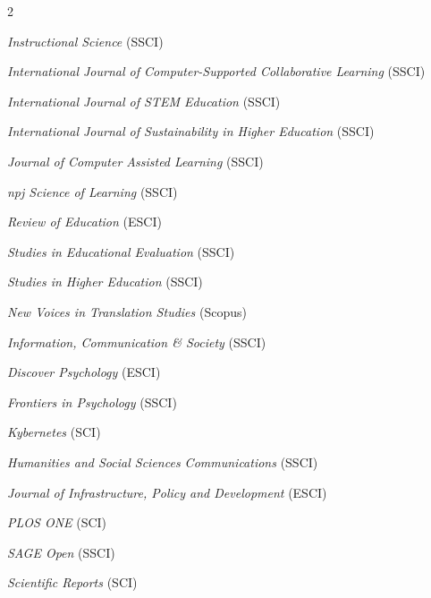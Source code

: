 \documentclass[11pt,a4paper]{article}
\begin{document}
\begin{multicols}{2}
\begin{list}{}{\setlength{\leftmargin}{0em}\setlength{\topsep}{0pt}\setlength{\partopsep}{0pt}\setlength{\parskip}{0em}\setlength{\itemsep}{0.03em}\setlength{\parsep}{0em}}
  \item \textit{Instructional Science} {\footnotesize\color{black!65}(SSCI)}
  \item \textit{International Journal of Computer-Supported Collaborative Learning} {\footnotesize\color{black!65}(SSCI)}
  \item \textit{International Journal of STEM Education} {\footnotesize\color{black!65}(SSCI)}
  \item \textit{International Journal of Sustainability in Higher Education} {\footnotesize\color{black!65}(SSCI)}
  \item \textit{Journal of Computer Assisted Learning} {\footnotesize\color{black!65}(SSCI)}
  \item \textit{npj Science of Learning} {\footnotesize\color{black!65}(SSCI)}
  \item \textit{Review of Education} {\footnotesize\color{black!65}(ESCI)}
  \item \textit{Studies in Educational Evaluation} {\footnotesize\color{black!65}(SSCI)}
  \item \textit{Studies in Higher Education} {\footnotesize\color{black!65}(SSCI)}
  \item \textit{New Voices in Translation Studies} {\footnotesize\color{black!65}(Scopus)}
  \item \textit{Information, Communication \& Society} {\footnotesize\color{black!65}(SSCI)}
  \item \textit{Discover Psychology} {\footnotesize\color{black!65}(ESCI)}
  \item \textit{Frontiers in Psychology} {\footnotesize\color{black!65}(SSCI)}
  \item \textit{Kybernetes} {\footnotesize\color{black!65}(SCI)}
  \item \textit{Humanities and Social Sciences Communications} {\footnotesize\color{black!65}(SSCI)}
  \item \textit{Journal of Infrastructure, Policy and Development} {\footnotesize\color{black!65}(ESCI)}
  \item \textit{PLOS ONE} {\footnotesize\color{black!65}(SCI)}
  \item \textit{SAGE Open} {\footnotesize\color{black!65}(SSCI)}
  \item \textit{Scientific Reports} {\footnotesize\color{black!65}(SCI)}
\end{list}
\end{multicols}
\end{document}
